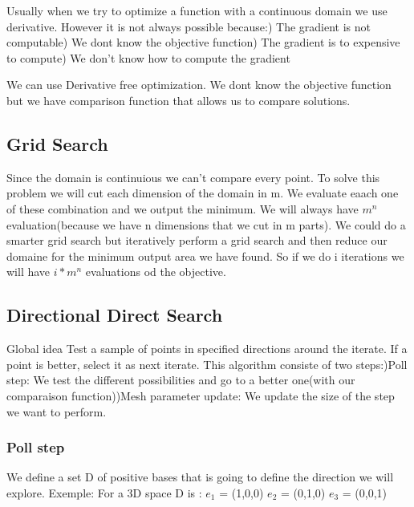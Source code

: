 Usually when we try to optimize a function with a continuous domain we use derivative.
However it is not always possible because:) The gradient is not computable) We dont know the objective function) The gradient is to expensive to compute) We don't know how to compute the gradient\newline

We can use Derivative free optimization.
We dont know the objective function but we have comparison function that allows us to compare solutions.

\subsection{Grid Search}
Since the domain is continuious we can't compare every point. To solve this problem we will cut each dimension of the domain in m. We evaluate eaach one of these combination and we output the minimum.
We will always have $m^n$ evaluation(because we have n dimensions that we cut in m parts).
We could do a smarter grid search but iteratively perform a grid search and then reduce our domaine for the minimum output area we have found.
So if we do i iterations we will have $i * m^n$ evaluations od the objective.
\subsection{Directional Direct Search}
Global idea\newline
Test a sample of points in specified directions around the iterate.
If a point is better, select it as next iterate.\newline
This algorithm consiste of two steps:)Poll step:\newline
We test the different possibilities and go to a better one(with our comparaison function))Mesh parameter update:\newline
We update the size of the step we want to perform.\newline
\subsubsection{Poll step}
We define a set D of positive bases that is going to define the direction we will explore.
Exemple:\newline
For a 3D space D is :\newline
$e_1$ = (1,0,0)\newline
$e_2$ = (0,1,0)\newline
$e_3$ = (0,0,1)\newline

